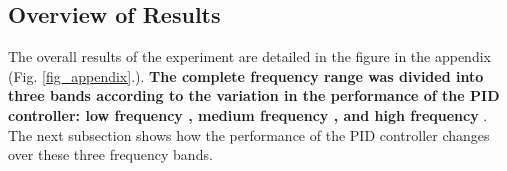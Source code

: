 \documentclass[conference]{IEEEtran}
\begin{document}
\subsection{Overview of Results}
The overall results of the experiment are detailed in the figure in the appendix (Fig. \ref{fig_appendix}.). \textbf{The complete frequency range was divided into three bands according to the variation in the performance of the PID controller: low frequency , medium frequency , and high frequency }. The next subsection shows how the performance of the PID controller changes over these three frequency bands.
\end{document}
